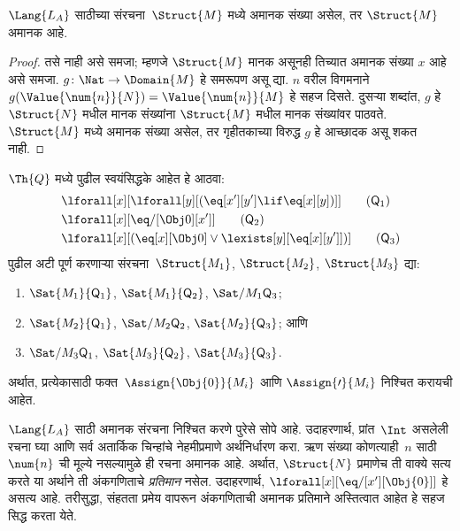 \begin{prop}
$\Lang{L_A}$ साठीच्या संरचना~$\Struct{M}$ मध्ये अमानक संख्या
असेल, तर $\Struct{M}$ अमानक आहे.
\end{prop}

\begin{proof}
तसे नाही असे समजा; म्हणजे $\Struct{M}$ मानक असूनही तिच्यात अमानक संख्या
$x$ आहे असे समजा. $g\colon \Nat \to \Domain{M}$ हे समरूपण असू द्या.
$n$ वरील विगमनाने $g(\Value{\num{n}}{N}) = \Value{\num{n}}{M}$ हे सहज
दिसते. दुसऱ्या शब्दांत, $g$ हे~$\Struct{N}$ मधील मानक संख्यांना
$\Struct{M}$ मधील मानक संख्यांवर पाठवते. $\Struct{M}$ मध्ये अमानक संख्या
असेल, तर गृहीतकाच्या विरुद्ध $g$ हे आच्छादक असू शकत नाही.
\end{proof}

\begin{prob}
$\Th{Q}$ मध्ये पुढील स्वयंसिद्धके आहेत हे आठवा:
\begin{align*}
& \lforall[x][\lforall[y][(\eq[x'][y'] \lif \eq[x][y])]] \tag{$\mathsf{Q}_1$}\\
& \lforall[x][\eq/[\Obj 0][x']] \tag{$\mathsf{Q}_2$}\\
& \lforall[x][(\eq[x][\Obj 0] \lor \lexists[y][\eq[x][y']])] \tag{$\mathsf{Q}_3$}
\end{align*}
पुढील अटी पूर्ण करणाऱ्या संरचना~$\Struct{M_1}$, $\Struct{M_2}$,
$\Struct{M_3}$ द्या:
\begin{enumerate}
\item $\Sat{M_1}{\mathsf{Q}_1}$, $\Sat{M_1}{\mathsf{Q}_2}$, $\Sat/{M_1}{\mathsf{Q}_3}$;
\item $\Sat{M_2}{\mathsf{Q}_1}$, $\Sat/{M_2}{\mathsf{Q}_2}$, $\Sat{M_2}{\mathsf{Q}_3}$; आणि
\item $\Sat/{M_3}{\mathsf{Q}_1}$, $\Sat{M_3}{\mathsf{Q}_2}$, $\Sat{M_3}{\mathsf{Q}_3}$.
\end{enumerate}
अर्थात, प्रत्येकासाठी फक्त~$\Assign{\Obj{0}}{M_i}$ आणि
$\Assign{\prime}{M_i}$ निश्चित करायची आहेत.
\end{prob}

\begin{explain}
$\Lang{L_A}$ साठी अमानक संरचना निश्चित करणे पुरेसे सोपे आहे.
उदाहरणार्थ, प्रांत~$\Int$ असलेली रचना घ्या आणि सर्व अतार्किक चिन्हांचे
नेहमीप्रमाणे अर्थनिर्धारण करा. ऋण संख्या कोणत्याही~$n$ साठी $\num{n}$ ची
मूल्ये नसल्यामुळे ही रचना अमानक आहे. अर्थात, $\Struct{N}$ प्रमाणेच ती
वाक्ये सत्य करते या अर्थाने ती अंकगणिताचे \emph{प्रतिमान} नसेल. उदाहरणार्थ,
$\lforall[x][\eq/[x'][\Obj{0}]]$ हे असत्य आहे. तरीसुद्धा, संहतता प्रमेय
वापरून अंकगणिताची अमानक प्रतिमाने अस्तित्वात आहेत हे सहज सिद्ध करता येते.
\end{explain}


